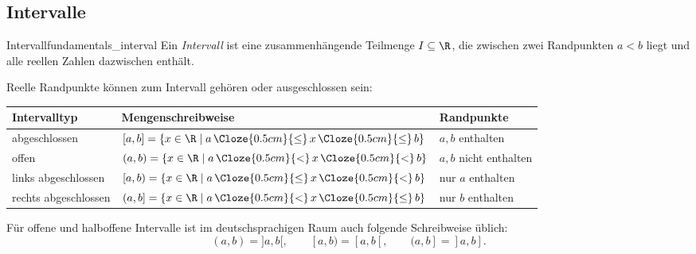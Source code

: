 \subsection{Intervalle}
\label{subsec:fundamentals_intervals}

\begin{DefinitionBox}{Intervall}{fundamentals_interval}
  Ein \emph{Intervall}  ist eine zusammenhängende
  Teilmenge $I\subseteq\R$, die zwischen zwei Randpunkten $a<b$ liegt und alle
  reellen Zahlen dazwischen enthält.

  \begin{center}
  \end{center}
\end{DefinitionBox}

Reelle Randpunkte können zum Intervall gehören oder ausgeschlossen sein:\par

\renewcommand{\arraystretch}{1.35}
\begin{tabularx}{\linewidth}{@{}l >{\centering\arraybackslash}X l@{}}
  \toprule
  \textbf{Intervalltyp} & \textbf{Mengenschreibweise} & \textbf{Randpunkte} \\
  \midrule
  abgeschlossen
    & $[a,b]=\{x\in\R\mid a\,\Cloze{0.5cm}{\leq}\,x\,\Cloze{0.5cm}{\leq}\,b\}$
    & $a,b$ enthalten \\
  offen
    & $(a,b)=\{x\in\R\mid a\,\Cloze{0.5cm}{<}\,x\,\Cloze{0.5cm}{<}\,b\}$
    & $a,b$ nicht enthalten \\
  links abgeschlossen
    & $[a,b)=\{x\in\R\mid a\,\Cloze{0.5cm}{\leq}\,x\,\Cloze{0.5cm}{<}\,b\}$
    & nur $a$ enthalten \\
  rechts abgeschlossen
    & $(a,b]=\{x\in\R\mid a\,\Cloze{0.5cm}{<}\,x\,\Cloze{0.5cm}{\leq}\,b\}$
    & nur $b$ enthalten \\
  \bottomrule
\end{tabularx}
\renewcommand{\arraystretch}{1}

\begin{RemarkBox}[remark title=Alternative Intervallschreibweise]
  Für offene und halboffene Intervalle ist im deutschsprachigen Raum auch
  folgende Schreibweise üblich:
  \[
    (a,b)=]a,b[,
    \qquad
    [a,b)=[a,b[,
    \qquad
    (a,b]=]a,b].
  \]
\end{RemarkBox}


